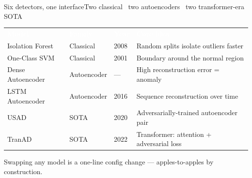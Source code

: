 \documentclass[aspectratio=169,11pt]{beamer}
\begin{document}
\begin{frame}{Six detectors, one interface}{Two classical \textperiodcentered\ two autoencoders \textperiodcentered\ two transformer-era SOTA}
\renewcommand{\arraystretch}{1.3}\small
\begin{tabular}{>{\raggedright\arraybackslash}p{3.2cm} >{\raggedright\arraybackslash}p{2.2cm} p{1.2cm} >{\raggedright\arraybackslash}p{6.0cm}}
\rowcolor{navy}\textcolor{white}{\textbf{Model}} & \textcolor{white}{\textbf{Family}} & \textcolor{white}{\textbf{Year}} & \textcolor{white}{\textbf{Core idea}}\\
\rowcolor{rowalt}Isolation Forest & Classical & 2008 & Random splits isolate outliers faster\\
One-Class SVM & Classical & 2001 & Boundary around the normal region\\
\rowcolor{rowalt}Dense Autoencoder & Autoencoder & --- & High reconstruction error = anomaly\\
LSTM Autoencoder & Autoencoder & 2016 & Sequence reconstruction over time\\
\rowcolor{rowalt}USAD & SOTA & 2020 & Adversarially-trained autoencoder pair\\
TranAD & SOTA & 2022 & Transformer: attention + adversarial loss\\
\end{tabular}
\vspace{2mm}
\begin{center}\small\color{muted}Swapping any model is a one-line config change --- apples-to-apples by construction.\end{center}
\end{frame}
\end{document}

